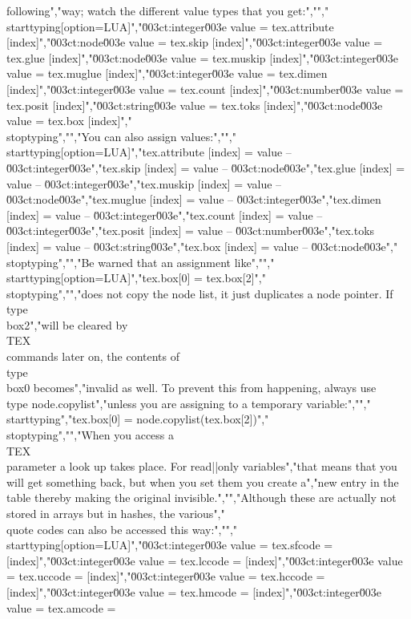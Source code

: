 following","way; watch the different value types that you get:","","\\starttyping[option=LUA]","\u003ct:integer\u003e value = tex.attribute [index]","\u003ct:node\u003e    value = tex.skip      [index]","\u003ct:integer\u003e value = tex.glue      [index]","\u003ct:node\u003e    value = tex.muskip    [index]","\u003ct:integer\u003e value = tex.muglue    [index]","\u003ct:integer\u003e value = tex.dimen     [index]","\u003ct:integer\u003e value = tex.count     [index]","\u003ct:number\u003e  value = tex.posit     [index]","\u003ct:string\u003e  value = tex.toks      [index]","\u003ct:node\u003e    value = tex.box       [index]","\\stoptyping","","You can also assign values:","","\\starttyping[option=LUA]","tex.attribute [index] = value -- \u003ct:integer\u003e","tex.skip      [index] = value -- \u003ct:node\u003e","tex.glue      [index] = value -- \u003ct:integer\u003e","tex.muskip    [index] = value -- \u003ct:node\u003e","tex.muglue    [index] = value -- \u003ct:integer\u003e","tex.dimen     [index] = value -- \u003ct:integer\u003e","tex.count     [index] = value -- \u003ct:integer\u003e","tex.posit     [index] = value -- \u003ct:number\u003e","tex.toks      [index] = value -- \u003ct:string\u003e","tex.box       [index] = value -- \u003ct:node\u003e","\\stoptyping","","Be warned that an assignment like","","\\starttyping[option=LUA]","tex.box[0] = tex.box[2]","\\stoptyping","","does not copy the node list, it just duplicates a node pointer. If \\type {\\box2}","will be cleared by \\TEX\\ commands later on, the contents of \\type {\\box0} becomes","invalid as well. To prevent this from happening, always use \\type {node.copylist}","unless you are assigning to a temporary variable:","","\\starttyping","tex.box[0] = node.copylist(tex.box[2])","\\stoptyping","","When you access a \\TEX\\ parameter a look up takes place. For read||only variables","that means that you will get something back, but when you set them you create a","new entry in the table thereby making the original invisible.","","Although these are actually not stored in arrays but in hashes, the various","\\quote {codes} can also be accessed this way:","","\\starttyping[option=LUA]","\u003ct:integer\u003e value = tex.sfcode   = [index]","\u003ct:integer\u003e value = tex.lccode   = [index]","\u003ct:integer\u003e value = tex.uccode   = [index]","\u003ct:integer\u003e value = tex.hccode   = [index]","\u003ct:integer\u003e value = tex.hmcode   = [index]","\u003ct:integer\u003e value = tex.amcode   = 